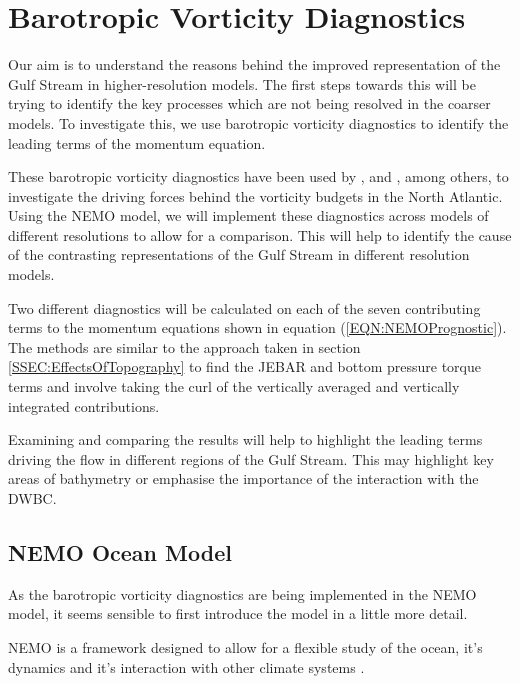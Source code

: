 \documentclass[..\report.tex]{subfiles}
\begin{document}
\section{Barotropic Vorticity Diagnostics}
\label{SEC:Diagnostics}

Our aim is to understand the reasons behind the improved representation of the Gulf Stream in higher-resolution models. The first steps towards this will be trying to identify the key processes which are not being resolved in the coarser models. To investigate this, we use barotropic vorticity diagnostics to identify the leading terms of the momentum equation.

These barotropic vorticity diagnostics have been used by \citet{Bell1999}, \citet{Gula2014} and \citet{Yeager2015}, among others, to investigate the driving forces behind the vorticity budgets in the North Atlantic.
Using the \gls{NEMO} model, we will implement these diagnostics across models of different resolutions to allow for a comparison. This will help to identify the cause of the contrasting representations of the Gulf Stream in different resolution models. \par

Two different diagnostics will be calculated on each of the seven contributing terms to the momentum equations shown in equation (\ref{EQN:NEMOPrognostic}). The methods are similar to the approach taken in section \ref{SSEC:EffectsOfTopography} to find the JEBAR and bottom pressure torque terms and involve taking the curl of the vertically averaged and vertically integrated contributions.\par

Examining and comparing the results will help to highlight the leading terms driving the flow in different regions of the Gulf Stream. This may highlight key areas of bathymetry or emphasise the importance of the interaction with the \gls{DWBC}.

\subsection{\gls{NEMO} Ocean Model}
\label{SSEC:NEMO}

As the barotropic vorticity diagnostics are being implemented in the \gls{NEMO} model, it seems sensible to first introduce the model in a little more detail. \par
\gls{NEMO} is a framework designed to allow for a flexible study of the ocean, it's dynamics and it's interaction with other climate systems \citep{Madec2011}. \par
\end{document}
